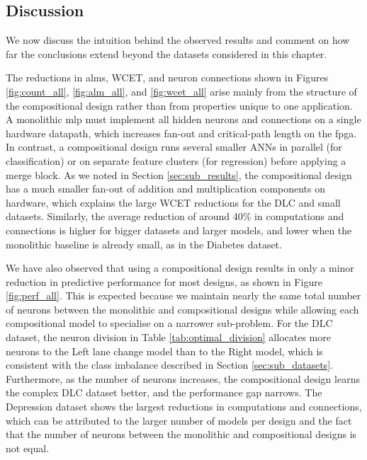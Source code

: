 \subsection{Discussion}
We now discuss the intuition behind the observed results and comment on how far the conclusions extend beyond the datasets considered in this chapter.

The reductions in \glspl{alm}, WCET, and neuron connections shown in Figures \ref{fig:count_all}, \ref{fig:alm_all}, and \ref{fig:wcet_all} arise mainly from the structure of the compositional design rather than from properties unique to one application. A monolithic \gls{mlp} must implement all hidden neurons and connections on a single hardware datapath, which increases fan-out and critical-path length on the \gls{fpga}. In contrast, a compositional design runs several smaller ANNs in parallel (for classification) or on separate feature clusters (for regression) before applying a merge block. As we noted in Section \ref{sec:sub_results}, the compositional design has a much smaller fan-out of addition and multiplication components on hardware, which explains the large WCET reductions for the DLC and small datasets. Similarly, the average reduction of around 40\% in computations and connections is higher for bigger datasets and larger models, and lower when the monolithic baseline is already small, as in the Diabetes dataset.

We have also observed that using a compositional design results in only a minor reduction in predictive performance for most designs, as shown in Figure \ref{fig:perf_all}. This is expected because we maintain nearly the same total number of neurons between the monolithic and compositional designs while allowing each compositional model to specialise on a narrower sub-problem. For the DLC dataset, the neuron division in Table \ref{tab:optimal_division} allocates more neurons to the Left lane change model than to the Right model, which is consistent with the class imbalance described in Section \ref{sec:sub_datasets}. Furthermore, as the number of neurons increases, the compositional design learns the complex DLC dataset better, and the performance gap narrows. The Depression dataset shows the largest reductions in computations and connections, which can be attributed to the larger number of models per design and the fact that the number of neurons between the monolithic and compositional designs is not equal. 

